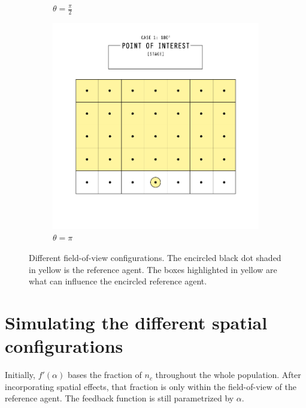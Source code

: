 \begin{figure}[h]
\begin{subfigure}[b]{0.3\linewidth}
    \caption{$\theta = \frac{\pi}{2}$}
  \end{subfigure}
    \begin{subfigure}[b]{0.3\linewidth}
    \includegraphics[width=\linewidth]{images/chapter4/180degD.png}
    \caption{$\theta = \pi$}
  \end{subfigure}
  \caption{Different field-of-view configurations. The encircled black dot shaded in yellow is the reference agent. The boxes highlighted in yellow are what can influence the  encircled reference agent.}
  \label{fig:spaceconfig}
\end{figure}

\section{Simulating the different spatial configurations}

\hspace{\parindent} Initially, $f'(\alpha)$ bases the fraction of $n_{c}$ throughout the whole population. After incorporating spatial effects, that fraction is only within the field-of-view of the reference agent.
The feedback function is still parametrized by $\alpha$.

